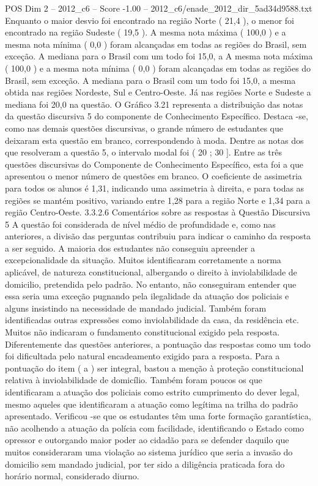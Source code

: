 \begin{textsample}{POS Dim 2 – 2012\_c6 – Score -1.00 – 2012\_c6/enade\_2012\_dir\_5ad34d9588.txt}
Enquanto o maior desvio foi encontrado na região Norte ( 21,4 ), o menor foi encontrado na região Sudeste ( 19,5 ).
A mesma nota máxima ( 100,0 ) e a mesma nota mínima ( 0,0 ) foram alcançadas em todas as regiões do Brasil, sem exceção.
A mediana para o Brasil com um todo foi 15,0, a A mesma nota máxima ( 100,0 ) e a mesma nota mínima ( 0,0 ) foram alcançadas em todas as regiões do Brasil, sem exceção.
A mediana para o Brasil com um todo foi 15,0, a mesma obtida nas regiões Nordeste, Sul e Centro-Oeste.
Já nas regiões Norte e Sudeste a mediana foi 20,0 na questão.
O Gráfico 3.21 representa a distribuição das notas da questão discursiva 5 do componente de Conhecimento Específico.
Destaca -se, como nas demais questões discursivas, o grande número de estudantes que deixaram esta questão em branco, correspondendo à moda.
Dentre as notas dos que resolveram a questão 5, o intervalo modal foi ( 20 ; 30 ].
Entre as três questões discursivas do Componente de Conhecimento Específico, esta foi a que apresentou o menor número de questões em branco.
O coeficiente de assimetria para todos os alunos é 1,31, indicando uma assimetria à direita, e para todas as regiões se mantém positivo, variando entre 1,28 para a região Norte e 1,34 para a região Centro-Oeste. 3.3.2.6 Comentários sobre as respostas à Questão Discursiva 5 A questão foi considerada de nível médio de profundidade e, como nas anteriores, a divisão das perguntas contribuiu para indicar o caminho da resposta a ser seguido.
A maioria dos estudantes não conseguiu apreender a excepcionalidade da situação.
Muitos identificaram corretamente a norma aplicável, de natureza constitucional, albergando o direito à inviolabilidade de domicilio, pretendida pelo padrão.
No entanto, não conseguiram entender que essa seria uma exceção pugnando pela ilegalidade da atuação dos policiais e alguns insistindo na necessidade de mandado judicial.
Também foram identificadas outras expressões como inviolabilidade da casa, da residência etc.
Muitos não indicaram o fundamento constitucional exigido pela resposta.
Diferentemente das questões anteriores, a pontuação das respostas como um todo foi dificultada pelo natural encadeamento exigido para a resposta.
Para a pontuação do item ( a ) ser integral, bastou a menção à proteção constitucional relativa à inviolabilidade de domicílio.
Também foram poucos os que identificaram a atuação dos policiais como estrito cumprimento do dever legal, mesmo aqueles que identificaram a atuação como legítima na trilha do padrão apresentado.
Verificou -se que os estudantes têm uma forte formação garantística, não acolhendo a atuação da polícia com facilidade, identificando o Estado como opressor e outorgando maior poder ao cidadão para se defender daquilo que muitos consideraram uma violação ao sistema jurídico que seria a invasão do domicilio sem mandado judicial, por ter sido a diligência praticada fora do horário normal, considerado diurno.

\end{textsample}
